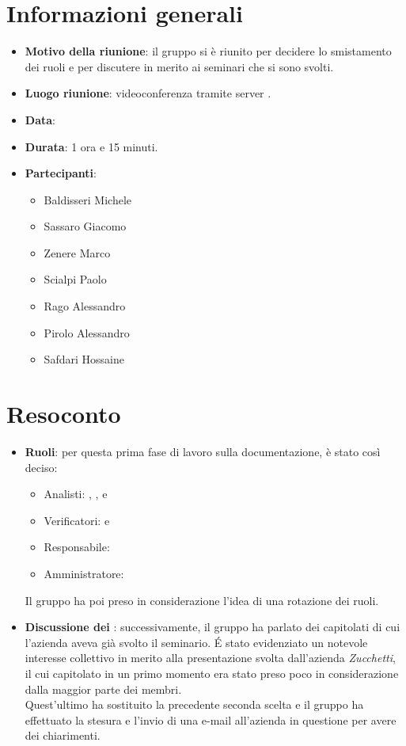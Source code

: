 \section{Informazioni generali}
\begin{itemize}
\item \textbf{Motivo della riunione}: il gruppo si è riunito per decidere lo smistamento dei ruoli e per discutere in merito ai seminari che si sono svolti.
\item \textbf{Luogo riunione}: videoconferenza tramite server .
\item \textbf{Data}: \Data{}
\item \textbf{Durata}: 1 ora e 15 minuti.
\item \textbf{Partecipanti}:
	\begin{itemize}
	\item Baldisseri Michele
	\item Sassaro Giacomo
	\item Zenere Marco
	\item Scialpi Paolo
	\item Rago Alessandro
	\item Pirolo Alessandro
	\item Safdari Hossaine
	\end{itemize}
\end{itemize}
\newpage
\section{Resoconto}
\begin{itemize}
\item \textbf{Ruoli}: per questa prima fase di lavoro sulla documentazione, è stato così deciso:
\begin{itemize}
\item Analisti: \SH{}, \ZM{}, \RA{} e \SP{}
\item Verificatori: \PA{} e \BM{} 
\item Responsabile: \SG{}
\item Amministratore: \BM{}
\end{itemize}
Il gruppo ha poi preso in considerazione l'idea di una rotazione dei ruoli.

\item \textbf{Discussione dei }: successivamente, il gruppo ha parlato dei capitolati di cui l'azienda aveva già svolto il seminario. \'E stato evidenziato un notevole interesse collettivo in merito alla presentazione svolta dall'azienda \textit{Zucchetti}, il cui capitolato in un primo momento era stato preso poco in considerazione dalla maggior parte dei membri.\\ Quest'ultimo ha sostituito la precedente seconda scelta e il gruppo ha effettuato la stesura e l'invio di una e-mail all'azienda in questione per avere dei chiarimenti.
\end{itemize}